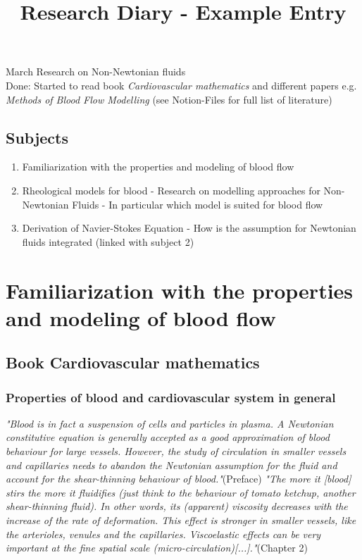 \documentclass[11pt,letterpaper]{article}
\begin{document}
\univlogo

\title{Research Diary - Example Entry}

{\Huge March Research on Non-Newtonian fluids}\\[5mm]
Done: Started to read book \textit{Cardiovascular mathematics} and different papers e.g.  \textit{Methods of Blood Flow Modelling} (see Notion-Files for full list of literature)

\subsection*{Subjects}

\begin{enumerate}
\item Familiarization with the properties and modeling of blood flow
\item Rheological models for blood - Research on modelling approaches for Non-Newtonian Fluids - In particular which model is suited for blood flow 
    \item Derivation of Navier-Stokes Equation - How is the assumption for Newtonian fluids integrated (linked with subject 2)
\end{enumerate}

\section{Familiarization with the properties and modeling of blood flow}
\subsection{Book Cardiovascular mathematics }
\subsubsection*{Properties of blood and cardiovascular system in general}

\textit{"Blood is in fact a suspension of cells and particles in plasma. A Newtonian constitutive equation is generally accepted as a good approximation of blood behaviour for large vessels. However, the study of circulation in smaller vessels and capillaries needs to abandon the Newtonian assumption for the fluid and account for the shear-thinning behaviour of blood."}(Preface) \newline\newline 
\textit{"The more it [blood] stirs the more it fluidifies (just think to the behaviour of tomato ketchup, another shear-thinning fluid). In other words, its (apparent) viscosity decreases with the increase of the rate of deformation. This effect is stronger in smaller vessels, like the arterioles, venules and the capillaries. Viscoelastic effects can be very important at the fine spatial scale (micro-circulation)[...]."}(Chapter 2)
\end{document}
